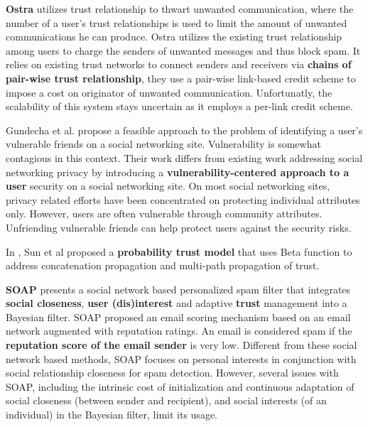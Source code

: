 
\textbf{Ostra} \cite{mislove_ostra_2008} utilizes trust relationship to thwart unwanted communication,
	where the number of a user’s trust relationships is used to limit the amount of unwanted communications he can produce.
Ostra utilizes the existing trust relationship among users to charge the senders of unwanted messages and thus block spam.
It relies on existing trust networks to connect senders and receivers via \textbf{chains of pair-wise trust relationship},
	they use a pair-wise link-based credit scheme to impose a cost on originator of unwanted communication.
Unfortunatly,
	the scalability of this system stays uncertain as it employs a per-link credit scheme.

Gundecha et al. \cite{gundecha_exploiting_2011} propose a feasible approach to the problem of identifying a user’s vulnerable friends on a social networking site.
Vulnerability is somewhat contagious in this context.
Their work differs from existing work addressing social networking privacy by introducing a \textbf{vulnerability-centered approach to a user} security on a social networking site.
On most social networking sites,
	privacy related efforts have been concentrated on protecting individual attributes only.
However,
	users are often vulnerable through community attributes.
Unfriending vulnerable friends can help protect users against the security risks.

%
In \cite{zeng_trustaware_2014},
	Sun et al proposed a \textbf{probability trust model} that uses Beta function to address concatenation propagation and multi-path propagation of trust.


\textbf{SOAP} \cite{li_soap_2011} presents a social network based personalized spam filter that integrates \textbf{social closeness},
	\textbf{user (dis)interest} and adaptive \textbf{trust} management into a Bayesian filter.
SOAP proposed an email scoring mechanism based on an email network augmented with reputation ratings.
An email is considered spam if the \textbf{reputation score of the email sender} is very low.
Different from these social network based methods,
	SOAP focuses on personal interests in conjunction with social relationship closeness for spam detection.
However,
	several issues with SOAP,
	including the intrinsic cost of initialization and continuous adaptation of social closeness (between sender and recipient),
	and social interests (of an individual) in the Bayesian filter,
	limit its usage.

